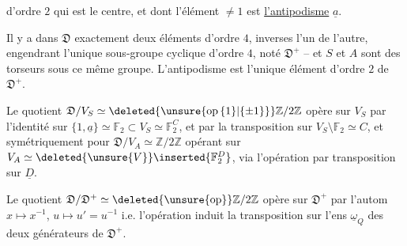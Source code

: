  d'ordre $2$  qui est le centre, et dont l'élément $\ne1$ est \uline{l'antipodisme} $\underline a$.

Il y a dans $\mathfrak{D}$ exactement deux éléments  d'ordre $4$, inverses l'un de l'autre, engendrant l'unique sous-groupe cyclique d'ordre $4$, noté $\mathfrak{D}^+$ -- et $S$ et $A$ sont des torseurs sous ce même groupe.  L'antipodisme est l'unique élément d'ordre $2$ de $\mathfrak{D}^+$. 


Le quotient $\mathfrak{D}/V_S\simeq\deleted{\unsure{\mathrm{op}\,\{1\}|\{\pm1\}}}\mathbb{Z}/2\mathbb{Z}$ opère sur $V_S$ par l'identité sur $\{1,\underline a\}\simeq\mathbb{F}_2\subset V_S\simeq\mathbb{F}_2^C$, et par la transposition sur $V_S\setminus\mathbb{F}_2\simeq C$, et symétriquement pour $\mathfrak{D}/V_A\simeq\mathbb{Z}/2\mathbb{Z}$ opérant sur $V_A\simeq\deleted{\unsure{V}}\inserted{\mathbb{F}_2^D}$,  via  l'opération par transposition sur $\underline D$.

Le quotient $\mathfrak{D}/\mathfrak{D}^+\simeq\deleted{\unsure{\mathrm{op}}}\mathbb{Z}/2\mathbb{Z}$ opère sur $\mathfrak{D}^+$ par l'autom  $x\longmapsto x^{-1}$,   $u\longmapsto u'=u^{-1}$ i.e. l'opération induit la transposition sur l'ens $\underline\omega_Q$ des deux générateurs de  $\mathfrak{D}^+$. 

